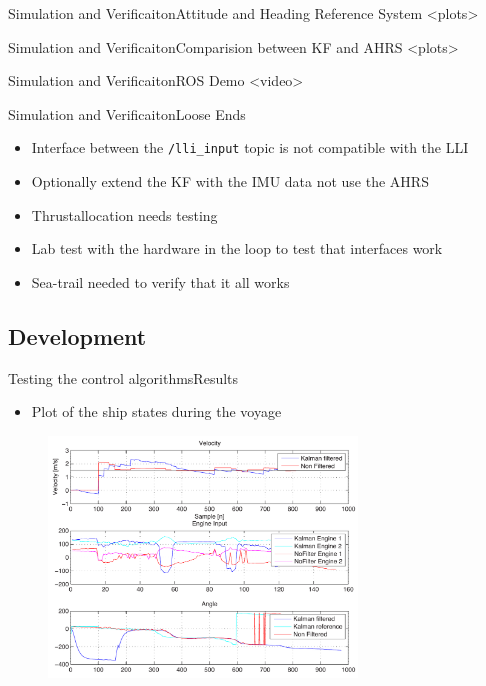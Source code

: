 \documentclass[10pt,handout]{beamer}
\begin{document}
\begin{frame}{Simulation and Verificaiton}{Attitude and Heading Reference System}
<plots>
\end{frame}

\begin{frame}{Simulation and Verificaiton}{Comparision between KF and AHRS}
<plots>
\end{frame}

\begin{frame}{Simulation and Verificaiton}{ROS Demo}
<video>
\end{frame}

\begin{frame}{Simulation and Verificaiton}{Loose Ends}
\begin{itemize}
  \item Interface between the \texttt{/lli\_input} topic is not compatible with the LLI
  \item Optionally extend the KF with the IMU data not use the AHRS
  \item Thrustallocation needs testing
  \item Lab test with the hardware in the loop to test that interfaces work
  \item Sea-trail needed to verify that it all works
\end{itemize}
\end{frame}


\subsection{Development}


\begin{frame}{Testing the control algorithms}{Results}
  \begin{itemize}
  \item Plot of the ship states during the voyage
  \end{itemize}
  \begin{figure}
    \begin{center}
      \includegraphics[width=8.2cm]{img/states}
      \label{fig:controltest3}
    \end{center}
  \end{figure}
\end{frame}
\end{document}
